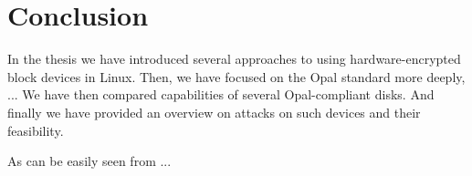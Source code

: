 

















\chapter{Conclusion}

In the thesis we have introduced several approaches to using hardware-encrypted block devices in Linux. Then, we have focused on the Opal standard more deeply, ... We have then compared capabilities of several Opal-compliant disks. And finally we have provided an overview on attacks on such devices and their feasibility.

As can be easily seen from ...




\newpage

\printbibliography[heading=bibintoc] %



